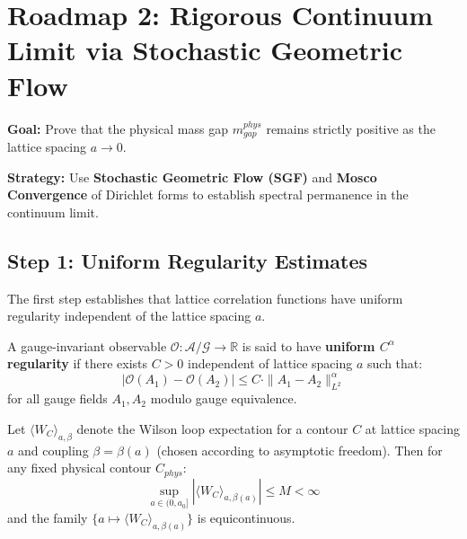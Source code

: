 \section{Roadmap 2: Rigorous Continuum Limit via Stochastic Geometric Flow}
\label{sec:roadmap2-continuum}

\textbf{Goal:} Prove that the physical mass gap $m_{gap}^{phys}$ remains strictly 
positive as the lattice spacing $a \to 0$.

\textbf{Strategy:} Use \textbf{Stochastic Geometric Flow (SGF)} and \textbf{Mosco Convergence} 
of Dirichlet forms to establish spectral permanence in the continuum limit.

\subsection{Step 1: Uniform Regularity Estimates}
\label{subsec:roadmap2-step1}

The first step establishes that lattice correlation functions have uniform 
regularity independent of the lattice spacing $a$.

\begin{definition}
\label{def:holder-gauge}
A gauge-invariant observable $\mathcal{O}: \mathcal{A}/\mathcal{G} \to \mathbb{R}$ is 
said to have \textbf{uniform $C^\alpha$ regularity} if there exists $C > 0$ independent 
of lattice spacing $a$ such that:
\[
|\mathcal{O}(A_1) - \mathcal{O}(A_2)| \leq C \cdot \|A_1 - A_2\|_{L^2}^\alpha
\]
for all gauge fields $A_1, A_2$ modulo gauge equivalence.
\end{definition}

\begin{theorem}
\label{thm:uniform-holder-app89}
Let $\langle W_C \rangle_{a,\beta}$ denote the Wilson loop expectation for a contour 
$C$ at lattice spacing $a$ and coupling $\beta = \beta(a)$ (chosen according to 
asymptotic freedom). Then for any fixed physical contour $C_{phys}$:
\[
\sup_{a \in (0, a_0]} \left| \langle W_C \rangle_{a,\beta(a)} \right| \leq M < \infty
\]
and the family $\{a \mapsto \langle W_C \rangle_{a,\beta(a)}\}$ is equicontinuous.
\end{theorem}

